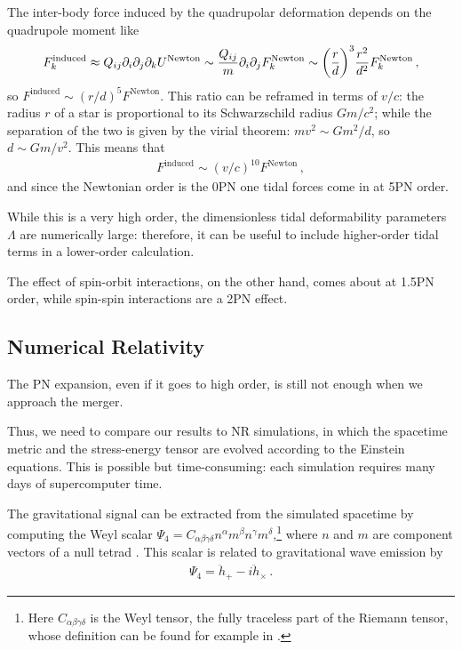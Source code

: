 \documentclass[main.tex]{subfiles}
\begin{document}
The inter-body force induced by the quadrupolar deformation depends on the quadrupole moment like \cite[eqs.\ 5.219, 5.235]{maggioreGravitationalWavesVolume2007}
%
\begin{align}
F ^{\text{induced}}_k \approx Q_{ij} \partial_{i} \partial_{j} \partial_{k} U^{\text{Newton}} \sim \frac{Q_{ij}}{m} \partial_{i} \partial_{j} F^{\text{Newton}}_k \sim \qty( \frac{r}{d})^3 \frac{r^2}{d^2} F^{\text{Newton}}_k
\,,
\end{align}
%
so \(F^{\text{induced}} \sim (r/d)^{5} F^{\text{Newton}}\). 
This ratio can be reframed in terms of \(v/c\): the radius \(r\) of a star is proportional to its Schwarzschild radius \(Gm/c^2\); while the separation of the two is given by the virial theorem: \(m v^2 \sim Gm^2 /d\), so \(d \sim Gm / v^2\). This means that 
%
\begin{align}
F^{\text{induced}} \sim (v/c)^{10} F^{\text{Newton}}
\,,
\end{align}
%
and since the Newtonian order is the 0PN one tidal forces come in at 5PN order. 

While this is a very high order, the dimensionless tidal deformability parameters \(\Lambda \) are numerically large: therefore, it can be useful to include higher-order tidal terms in a lower-order calculation. 

The effect of spin-orbit interactions, on the other hand, comes about at 1.5PN order, while spin-spin interactions are a 2PN effect.

\subsection{Numerical Relativity} \label{sec:nr}

The \ac{PN} expansion, even if it goes to high order, is still not enough when we approach the merger. 

Thus, we need to compare our results to \ac{NR} simulations, in which the spacetime metric and the stress-energy tensor are evolved according to the Einstein equations. 
This is possible but time-consuming: each simulation requires many days of supercomputer time. 

The gravitational signal can be extracted from the simulated spacetime by computing the Weyl scalar \(\Psi_{4} = C_{\alpha \beta \gamma \delta }n^\alpha m^\beta n^\gamma m^\delta \),\footnote{Here \(C_{\alpha \beta \gamma \delta }\) is the Weyl tensor, the fully traceless part of the Riemann tensor, whose definition can be found for example in \textcite[eq.\ 2.18]{gourgoulhonFormalismBasesNumerical2007}.} where \(n\) and \(m\) are component vectors of a null tetrad \cite[sec.\ 5.6.3]{lofflerEinsteinToolkitCommunity2012}. This scalar is related to gravitational wave emission by 
%
\begin{align}
\Psi_{4} = \ddot{h}_+ - i \ddot{h}_{\times }
\,.
\end{align}
\end{document}
